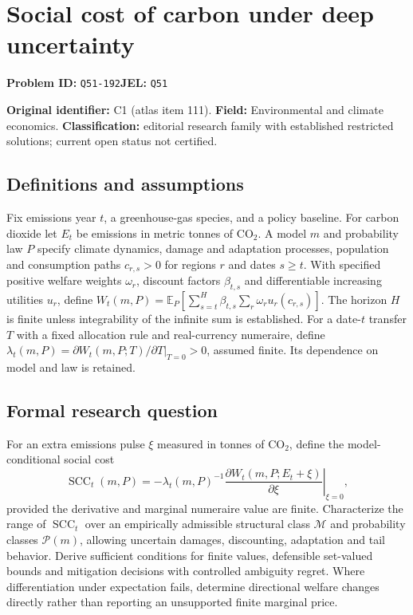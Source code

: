 \documentclass[11pt,a4paper]{article}
\begin{document}
\section*{Social cost of carbon under deep uncertainty}
\textbf{Problem ID:} \texttt{Q51-192}\quad \textbf{JEL:} \texttt{Q51}\par
\label{problem:OP-0111}
\label{atlas:prob:C1}

\noindent\textbf{Original identifier:} C1 (atlas item 111). \textbf{Field:} Environmental and climate economics. \textbf{Classification:} editorial research family with established restricted solutions; current open status not certified.

\subsection*{Definitions and assumptions}

Fix emissions year $t$, a greenhouse-gas species, and a policy baseline. For carbon dioxide let $E_t$ be emissions in metric tonnes of $\mathrm{CO}_2$. A model $m$ and probability law $P$ specify climate dynamics, damage and adaptation processes, population and consumption paths $c_{r,s}>0$ for regions $r$ and dates $s\ge t$. With specified positive welfare weights $\omega_r$, discount factors $\beta_{t,s}$ and differentiable increasing utilities $u_r$, define $W_t(m,P)=\mathbb E_P[\sum_{s=t}^{H}\beta_{t,s}\sum_r\omega_r u_r(c_{r,s})]$. The horizon $H$ is finite unless integrability of the infinite sum is established. For a date-$t$ transfer $T$ with a fixed allocation rule and real-currency numeraire, define $\lambda_t(m,P)=\left.\partial W_t(m,P;T)/\partial T\right|_{T=0}>0$, assumed finite. Its dependence on model and law is retained.

\subsection*{Formal research question}

For an extra emissions pulse $\xi$ measured in tonnes of $\mathrm{CO}_2$, define the model-conditional social cost
\[
\operatorname{SCC}_t(m,P)=
-\lambda_t(m,P)^{-1}
\left.\frac{\partial W_t(m,P;E_t+\xi)}{\partial\xi}\right|_{\xi=0},
\]
provided the derivative and marginal numeraire value are finite. Characterize the range of $\operatorname{SCC}_t$ over an empirically admissible structural class $\mathcal M$ and probability classes $\mathcal P(m)$, allowing uncertain damages, discounting, adaptation and tail behavior. Derive sufficient conditions for finite values, defensible set-valued bounds and mitigation decisions with controlled ambiguity regret. Where differentiation under expectation fails, determine directional welfare changes directly rather than reporting an unsupported finite marginal price.
\end{document}

